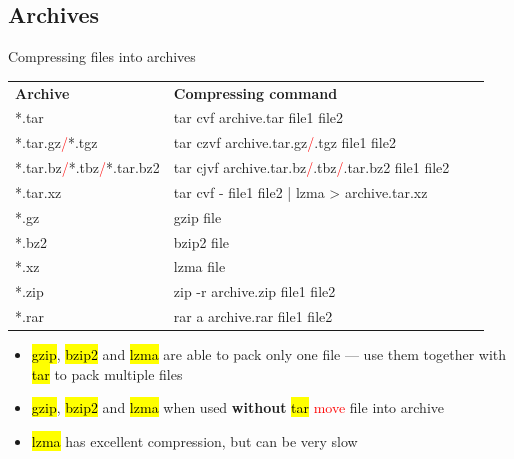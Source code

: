 \documentclass[compress, ucs, xelatex, 11pt, xcolor=svgnames,
  hyperref={
    bookmarks=true,
    unicode=true,
    colorlinks=true,
    pdftitle={Linux, command line and MetaCentrum},
    plainpages=false,
    pdfauthor={Vojtech Zeisek},
    pdfsubject={Course about use of Linux command line, writing shell scripts and using MetaCentrum of CESNET},
    pdfcreator={XeLaTeX},
    pdfkeywords={Linux, GNU, BASH, shell, command line, MetaCentrum},
    linkcolor=DarkRed,
    anchorcolor=DarkBlue,
    citecolor=Indigo,
    filecolor=NavyBlue,
    menucolor=DarkMagenta,
    urlcolor=DarkBlue,
    pdftex},
  url={hyphens, lowtilde} %
  ]{beamer}
\renewcommand{\texttt}[1]{\hl{\ttfamily #1}}
\renewcommand{\alert}[1]{\textcolor{red}{#1}}
\begin{document}
\subsection{Archives}

\begin{frame}{Compressing files into archives}
  \begin{center}
    \begin{tabular}{llll}
      \textbf{Archive} & \textbf{Compressing command}\\
      *.tar & tar cvf archive.tar file1 file2\\
      *.tar.gz\alert{/}*.tgz & tar czvf archive.tar.gz\alert{/}.tgz file1 file2\\
      *.tar.bz\alert{/}*.tbz\alert{/}*.tar.bz2 & tar cjvf archive.tar.bz\alert{/}.tbz\alert{/}.tar.bz2 file1 file2\\
      *.tar.xz & tar cvf - file1 file2 | lzma > archive.tar.xz\\
      *.gz & gzip file\\
      *.bz2 & bzip2 file\\
      *.xz & lzma file\\
      *.zip & zip -r archive.zip file1 file2\\
      *.rar & rar a archive.rar file1 file2
    \end{tabular}
  \end{center}
  \begin{itemize}
    \item \texttt{gzip}, \texttt{bzip2} and \texttt{lzma} are able to pack only one file --- use them together with \texttt{tar} to pack multiple files
    \item \texttt{gzip}, \texttt{bzip2} and \texttt{lzma} when used \textbf{without} \texttt{tar} \alert{move} file into archive
    \item \texttt{lzma} has excellent compression, but can be very slow
  \end{itemize}
\end{frame}
\end{document}
